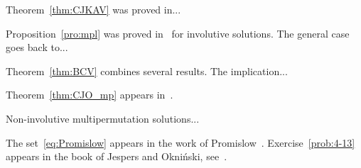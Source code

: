 Theorem~\ref{thm:CJKAV} was proved in... %

Proposition~\ref{pro:mpl} was proved in~\cite{MR3177933} 
for involutive solutions. The general case goes back to... 

Theorem~\ref{thm:BCV} combines several results. The implication... 

Theorem~\ref{thm:CJO_mp} appears in~\cite{MR3177933}. 

Non-involutive multipermutation solutions...

The set~\eqref{eq:Promislow} appears in the work of Promislow~\cite{MR940281}.
Exercise~\ref{prob:4-13} appears in the book of Jespers and Okni\'nski, see~\cite[Example 8.2.14]{MR2301033}. 
